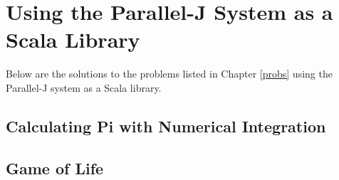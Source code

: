 \chapter{Using the Parallel-J System as a Scala Library}
\label{apsol}

Below are the solutions to the problems listed in Chapter \ref{probs} 
using the Parallel-J system as a Scala library.

\section{Calculating Pi with Numerical Integration}
\label{pjsPi}
\begin{singlespacing} 
\begin{small}
\end{small}
\end{singlespacing}

\section{Game of Life}
\label{pjsGol}
\begin{singlespacing} 
\begin{small}
\end{small}
\end{singlespacing}

